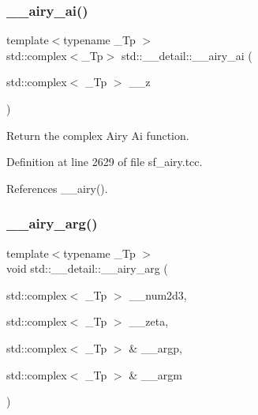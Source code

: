 \mbox{\label{namespacestd_1_1____detail_afd48b5702344f832a250922ac4ffb917}} 
\subsubsection{\texorpdfstring{\+\_\+\+\_\+airy\+\_\+ai()}{\_\_airy\_ai()}}
{\footnotesize\ttfamily template$<$typename \+\_\+\+Tp $>$ \\
std\+::complex$<$\+\_\+\+Tp$>$ std\+::\+\_\+\+\_\+detail\+::\+\_\+\+\_\+airy\+\_\+ai (\begin{DoxyParamCaption}\item[{std\+::complex$<$ \+\_\+\+Tp $>$}]{\+\_\+\+\_\+z }\end{DoxyParamCaption})}



Return the complex Airy Ai function. 



Definition at line 2629 of file sf\+\_\+airy.\+tcc.



References \+\_\+\+\_\+airy().

\mbox{\label{namespacestd_1_1____detail_a2473fe60310e9480137e3b66d3944f15}} 
\subsubsection{\texorpdfstring{\+\_\+\+\_\+airy\+\_\+arg()}{\_\_airy\_arg()}}
{\footnotesize\ttfamily template$<$typename \+\_\+\+Tp $>$ \\
void std\+::\+\_\+\+\_\+detail\+::\+\_\+\+\_\+airy\+\_\+arg (\begin{DoxyParamCaption}\item[{std\+::complex$<$ \+\_\+\+Tp $>$}]{\+\_\+\+\_\+num2d3,  }\item[{std\+::complex$<$ \+\_\+\+Tp $>$}]{\+\_\+\+\_\+zeta,  }\item[{std\+::complex$<$ \+\_\+\+Tp $>$ \&}]{\+\_\+\+\_\+argp,  }\item[{std\+::complex$<$ \+\_\+\+Tp $>$ \&}]{\+\_\+\+\_\+argm }\end{DoxyParamCaption})}



